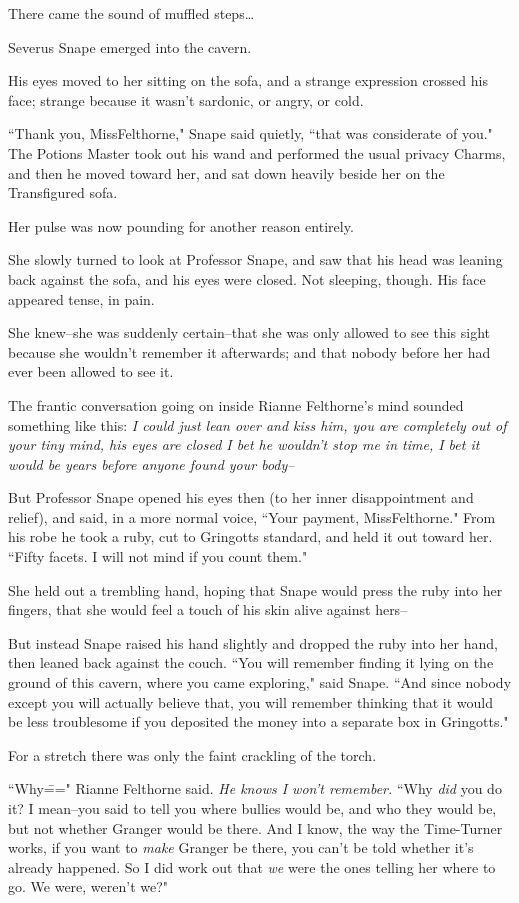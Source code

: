There came the sound of muffled steps{\ldots}

Severus Snape emerged into the cavern.

His eyes moved to her sitting on the sofa, and a strange expression crossed his face; strange because it wasn't sardonic, or angry, or cold.

``Thank you, Miss\?Felthorne," Snape said quietly, ``that was considerate of you." The Potions Master took out his wand and performed the usual privacy Charms, and then he moved toward her, and sat down heavily beside her on the Transfigured sofa.

Her pulse was now pounding for another reason entirely.

She slowly turned to look at Professor Snape, and saw that his head was leaning back against the sofa, and his eyes were closed. Not sleeping, though. His face appeared tense, in pain.

She knew\---she was suddenly certain\---that she was only allowed to see this sight because she wouldn't remember it afterwards; and that nobody before her had ever been allowed to see it.

The frantic conversation going on inside Rianne Felthorne's mind sounded something like this: \emph{I could just lean over and kiss him, you are completely out of your tiny mind, his eyes are closed I bet he wouldn't stop me in time, I bet it would be years before anyone found your body\---}

But Professor Snape opened his eyes then (to her inner disappointment and relief), and said, in a more normal voice, ``Your payment, Miss\?Felthorne." From his robe he took a ruby, cut to Gringotts standard, and held it out toward her. ``Fifty facets. I will not mind if you count them."

She held out a trembling hand, hoping that Snape would press the ruby into her fingers, that she would feel a touch of his skin alive against hers\---

But instead Snape raised his hand slightly and dropped the ruby into her hand, then leaned back against the couch. ``You will remember finding it lying on the ground of this cavern, where you came exploring," said Snape. ``And since nobody except you will actually believe that, you will remember thinking that it would be less troublesome if you deposited the money into a separate box in Gringotts."

For a stretch there was only the faint crackling of the torch.

``Why\===" Rianne Felthorne said. \emph{He knows I won't remember.} ``Why \emph{did} you do it? I mean\---you said to tell you where bullies would be, and who they would be, but not whether Granger would be there. And I know, the way the Time-Turner works, if you want to \emph{make} Granger be there, you can't be told whether it's already happened. So I did work out that \emph{we} were the ones telling her where to go. We were, weren't we?"


